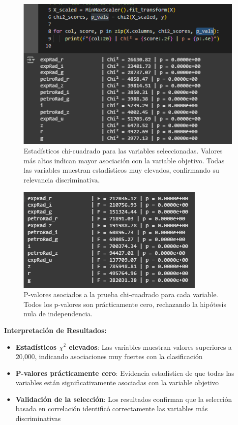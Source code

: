 \documentclass{article}
\begin{document}
\begin{figure}[H]
    \centering
    \includegraphics[width=0.8\linewidth]{chi2.png}
    \caption{Estadísticos chi-cuadrado para las variables seleccionadas. Valores más altos indican mayor asociación con la variable objetivo. Todas las variables muestran estadísticos muy elevados, confirmando su relevancia discriminativa.}
    \label{fig:chi2}
\end{figure}

\begin{figure}[H]
    \centering
    \includegraphics[width=0.8\linewidth]{p-value.png}
    \caption{P-valores asociados a la prueba chi-cuadrado para cada variable. Todos los p-valores son prácticamente cero, rechazando la hipótesis nula de independencia.}
    \label{fig:pvalue}
\end{figure}

\textbf{Interpretación de Resultados:}
\begin{itemize}
    \item \textbf{Estadísticos $\chi^2$ elevados}: Las variables muestran valores superiores a 20,000, indicando asociaciones muy fuertes con la clasificación
    \item \textbf{P-valores prácticamente cero}: Evidencia estadística de que todas las variables están significativamente asociadas con la variable objetivo
    \item \textbf{Validación de la selección}: Los resultados confirman que la selección basada en correlación identificó correctamente las variables más discriminativas
\end{itemize}
\end{document}
